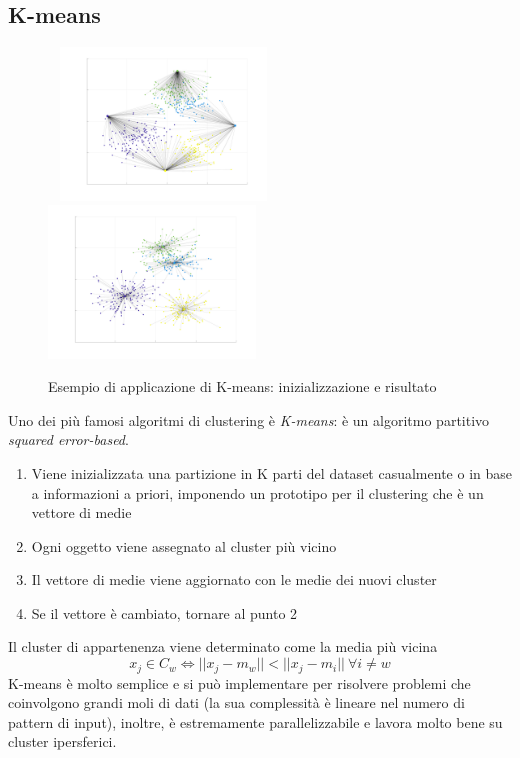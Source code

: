 \documentclass[12pt]{report}
\begin{document}
\subsection{K-means}
\begin{figure} \centering
	\caption{Esempio di applicazione di K-means: inizializzazione e risultato}
	\label{fig:kmeans}
	\ \newline 
	\includegraphics[width=0.49\textwidth,trim={2.5in 1.25in 1.5in 1.2in},clip]{../images/kmeans_0.pdf}
	\includegraphics[width=0.49\textwidth,trim={2.5in 1.25in 1.5in 1.2in},clip]{../images/kmeans_f.pdf}
\end{figure}
Uno dei più famosi algoritmi di clustering è \textit{K-means}: è un algoritmo partitivo \textit{squared error-based}.\begin{enumerate}
	\item Viene inizializzata una partizione in K parti del dataset casualmente o in base a informazioni a priori, imponendo un prototipo per il clustering che è un vettore di medie
	\item Ogni oggetto viene assegnato al cluster più vicino
	\item Il vettore di medie viene aggiornato con le medie dei nuovi cluster
	\item Se il vettore è cambiato, tornare al punto 2
\end{enumerate}
Il cluster di appartenenza viene determinato come la media più vicina
$$ x_j \in C_w \Leftrightarrow ||x_j-m_w||<||x_j-m_i|| \ \forall i \neq w $$
K-means è molto semplice e si può implementare per risolvere problemi che coinvolgono grandi moli di dati (la sua complessità è lineare nel numero di pattern di input), inoltre, è estremamente parallelizzabile e lavora molto bene su cluster ipersferici.
\end{document}
